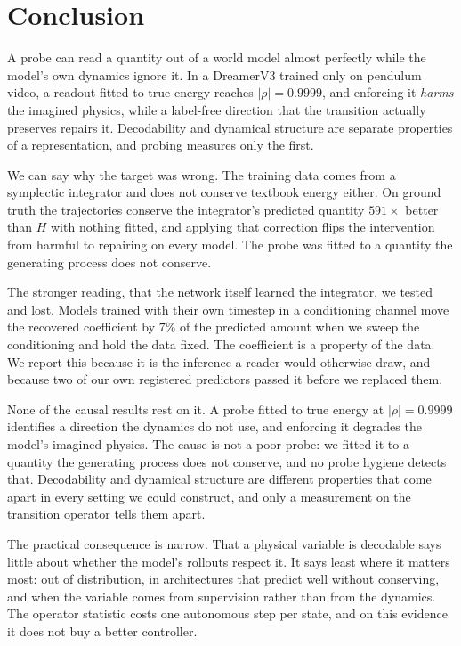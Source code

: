\section{Conclusion}
\label{sec:conclusion}

A probe can read a quantity out of a world model almost perfectly while the model's own dynamics
ignore it. In a DreamerV3 trained only on pendulum video, a readout fitted to true energy reaches
$|\rho| = 0.9999$, and enforcing it \emph{harms} the imagined physics, while a label-free direction
that the transition actually preserves repairs it. Decodability and dynamical structure are separate
properties of a representation, and probing measures only the first.

We can say why the target was wrong. The training data comes from a symplectic integrator and does
not conserve textbook energy either. On ground truth the trajectories conserve the integrator's
predicted quantity $591\times$ better than $H$ with nothing fitted, and applying that correction
flips the intervention from harmful to repairing on every model. The probe was fitted to a quantity
the generating process does not conserve.

The stronger reading, that the network itself learned the integrator, we tested and lost. Models
trained with their own timestep in a conditioning channel move the recovered coefficient by $7\%$ of
the predicted amount when we sweep the conditioning and hold the data fixed. The coefficient is a
property of the data. We report this because it is the inference a reader would otherwise draw, and
because two of our own registered predictors passed it before we replaced them.

None of the causal results rest on it. A probe fitted to true energy at $|\rho| = 0.9999$ identifies
a direction the dynamics do not use, and enforcing it degrades the model's imagined physics. The
cause is not a poor probe: we fitted it to a quantity the generating process does not conserve, and
no probe hygiene detects that. Decodability and dynamical structure are different properties that
come apart in every setting we could construct, and only a measurement on the transition operator
tells them apart.

The practical consequence is narrow. That a physical variable is decodable says little about whether
the model's rollouts respect it. It says least where it matters most: out of distribution, in
architectures that predict well without conserving, and when the variable comes from supervision
rather than from the dynamics. The operator statistic costs one autonomous step per state, and on
this evidence it does not buy a better controller.
